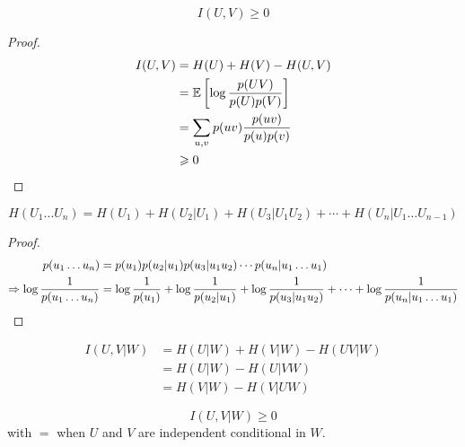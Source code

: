 \begin{theorem}
    \[
        I(U,V) \geqslant 0    
    \]
\end{theorem}
\begin{proof}
    \[
        \begin{aligned}
            I(U,V) &= H(U) + H(V) - H(U,V)\\
            &= \mathbb{E}\left[ \log\frac{p(UV)}{p(U)p(V)} \right]\\
            &= \sum\limits_{u,v} p(uv) \frac{p(uv)}{p(u)p(v)}\\
          &\geqslant 0  
        \end{aligned}            
    \]
\end{proof}

\begin{theorem}
    \[
        H(U_1\ldots U_n) = H(U_1) + H(U_2\vert U_1) + H(U_3\vert U_1 U_2) + \cdots + H(U_n \vert U_1\ldots U_{n-1})
    \]
\end{theorem}
\begin{proof}
    \[
        \begin{aligned}
            p(u_1\ldots u_n) &= p(u_1) p(u_2 \vert u_1) p(u_3\vert u_1u_2) \cdots p(u_n \vert u_1\ldots u_1)\\
            \Rightarrow \log\frac{1}{p(u_1\ldots u_n)} &= \log\frac{1}{p(u_1)} +  \log\frac{1}{p(u_2 \vert u_1)}+ \log\frac{1}{p(u_3\vert u_1u_2)} + \cdots + \log\frac{1}{p(u_n \vert u_1\ldots u_1)}
        \end{aligned}
    \]
\end{proof}

\begin{definition}
    \[
        \begin{aligned}
            I(U,V \vert W) &= H(U\vert W) + H(V\vert W) - H(UV \vert W)\\
             &= H(U \vert W) - H(U \vert V W)\\
             &= H(V \vert W) - H(V \vert U W)
        \end{aligned}
    \]
\end{definition}

\begin{theorem}
    \[
        I(U,V \vert W) \geqslant 0
    \]
    with $=$ when $U$ and $V$ are independent conditional in $W$.
\end{theorem}

\begin{theorem}
    
\end{theorem}